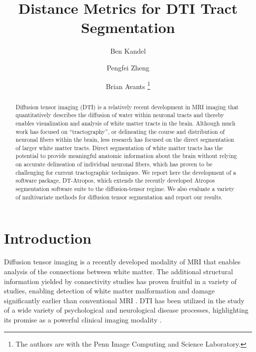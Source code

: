 \documentclass[10pt,a4paper, journal]{IEEEtran}
\author{Ben Kandel \and Pengfei Zheng \and Brian Avants
\thanks{The authors are with the Penn Image Computing and Science Laboratory.}}
\title{Distance Metrics for DTI Tract Segmentation}
\begin{document}
\maketitle
\begin{abstract}
Diffusion tensor imaging (DTI) is a relatively recent development in MRI imaging that quantitatively describes the diffusion of water within neuronal tracts and thereby enables visualization and analysis of white matter tracts in the brain.  Although much work has focused on ``tractography'', or delineating the course and distribution of neuronal fibers within the brain, less research has focused on the direct segmentation of larger white matter tracts.  Direct segmentation of white matter tracts has the potential to provide meaningful anatomic information about the brain without relying on accurate delineation of individual neuronal fibers, which has proven to be challenging for current tractographic techniques.  We report here the development of a software package, DT-Atropos, which extends the recently developed Atropos segmentation software suite to the diffusion-tensor regime.  We also evaluate a variety of multivariate methods for diffusion tensor segmentation and report our results. 
\end{abstract}

\section{Introduction}
Diffusion tensor imaging is a recently developed modality of MRI that enables analysis of the connections between white matter.  The additional structural information yielded by connectivity studies has proven fruitful in a variety of studies, enabling detection of white matter malformation and damage significantly earlier than conventional MRI \cite{le_bihan_diffusion_2001}.  DTI has been utilized in the study of a wide variety of psychological and neurological disease processes, highlighting its promise as a powerful clinical imaging modality \cite{thomason_diffusion_2011}.
\end{document}
